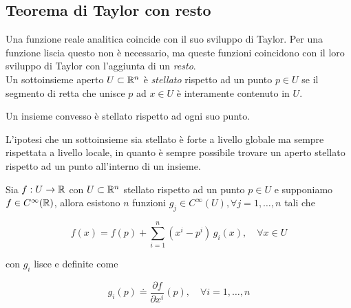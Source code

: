 \subsection{Teorema di Taylor con resto}

Una funzione reale analitica coincide con il suo sviluppo di Taylor. Per una funzione liscia questo non è necessario, ma queste funzioni coincidono con il loro sviluppo di Taylor con l'aggiunta di un \textit{resto}.\\
Un sottoinsieme aperto $ U \subset \mathbb{R}^{n} $ è \textit{stellato} rispetto ad un punto $ p \in U $ se il segmento di retta che unisce $ p $ ad $ x \in U $ è interamente contenuto in $ U $.

\begin{remark}
	Un insieme convesso è stellato rispetto ad ogni suo punto.
\end{remark}

L'ipotesi che un sottoinsieme sia stellato è forte a livello globale ma sempre rispettata a livello locale, in quanto è sempre possibile trovare un aperto stellato rispetto ad un punto all'interno di un insieme.

\begin{theorem}
	Sia $ f : U \to \mathbb{R} $ con $ U \subset \mathbb{R}^{n} $ stellato rispetto ad un punto $ p \in U $ e supponiamo $ f \in C^{\infty}(\mathbb{R}) $, allora esistono $ n $ funzioni $ g_{j} \in C^{\infty}(U), \forall j = 1,\dots,n $ tali che
	
	\begin{equation}
		f(x) = f(p) + \sum_{i=1}^{n} (x^{i}-p^{i}) \, g_{i}(x), \quad \forall x \in U
	\end{equation}
	
	con $ g_{i} $ lisce e definite come
	
	\begin{equation}
		g_{i}(p) \doteq \dfrac{\partial f}{\partial x^{i}} (p), \quad \forall i=1,\dots,n
	\end{equation}
\end{theorem}

